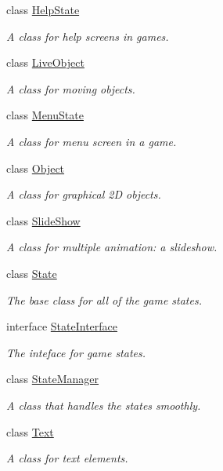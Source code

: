 \begin{DoxyCompactItemize}
class \hyperlink{classwp__engine_1_1_help_state}{Help\-State}
\begin{DoxyCompactList}\small\item\em A class for help screens in games. \end{DoxyCompactList}\item 
class \hyperlink{classwp__engine_1_1_live_object}{Live\-Object}
\begin{DoxyCompactList}\small\item\em A class for moving objects. \end{DoxyCompactList}\item 
class \hyperlink{classwp__engine_1_1_menu_state}{Menu\-State}
\begin{DoxyCompactList}\small\item\em A class for menu screen in a game. \end{DoxyCompactList}\item 
class \hyperlink{classwp__engine_1_1_object}{Object}
\begin{DoxyCompactList}\small\item\em A class for graphical 2\-D objects. \end{DoxyCompactList}\item 
class \hyperlink{classwp__engine_1_1_slide_show}{Slide\-Show}
\begin{DoxyCompactList}\small\item\em A class for multiple animation\-: a slideshow. \end{DoxyCompactList}\item 
class \hyperlink{classwp__engine_1_1_state}{State}
\begin{DoxyCompactList}\small\item\em The base class for all of the game states. \end{DoxyCompactList}\item 
interface \hyperlink{interfacewp__engine_1_1_state_interface}{State\-Interface}
\begin{DoxyCompactList}\small\item\em The inteface for game states. \end{DoxyCompactList}\item 
class \hyperlink{classwp__engine_1_1_state_manager}{State\-Manager}
\begin{DoxyCompactList}\small\item\em A class that handles the states smoothly. \end{DoxyCompactList}\item 
class \hyperlink{classwp__engine_1_1_text}{Text}
\begin{DoxyCompactList}\small\item\em A class for text elements. \end{DoxyCompactList}\end{DoxyCompactItemize}
